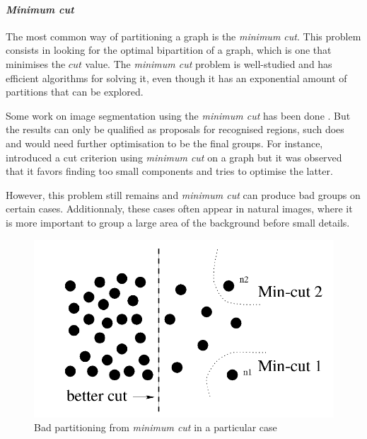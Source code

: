 \paragraph{\textit{Minimum cut}}

The most common way of partitioning a graph is the \textit{minimum cut}.
This problem consists in looking for the optimal bipartition of a graph, which is one that minimises the \(cut\) value.
The \textit{minimum cut} problem is well-studied and has efficient algorithms for solving it, even though it has an exponential amount of partitions that can be explored.

Some work on image segmentation using the \textit{minimum cut} has been done \cite{wu_optimal_1993} \cite{estrada_spectral_2004} \cite{felzenszwalb_efficient_2004}.
But the results can only be qualified as proposals for recognised regions, such does \cite{estrada_spectral_2004} and would need further optimisation to be the final groups.
For instance, \cite{wu_optimal_1993} introduced a cut criterion using \textit{minimum cut} on a graph but it was observed that it favors finding too small components and \cite{felzenszwalb_efficient_2004} tries to optimise the latter.

However, this problem still remains and \textit{minimum cut} can produce bad groups on certain cases.
Additionnaly, these cases often appear in natural images, where it is more important to group a large area of the background before small details.

\begin{figure}[!htbp]
 \centering
  \includegraphics[width=\textwidth]{img/mincutproblem.png}
 \caption{Bad partitioning from \textit{minimum cut} in a particular case \cite{shi_normalized_2000}}
\end{figure}

